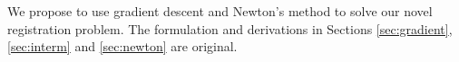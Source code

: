 \documentclass{article} %
\begin{document}
We propose to use gradient descent and Newton's method to solve our novel registration problem. The formulation and derivations in Sections \ref{sec:gradient}, \ref{sec:interm} and \ref{sec:newton} are original.





\end{document}
